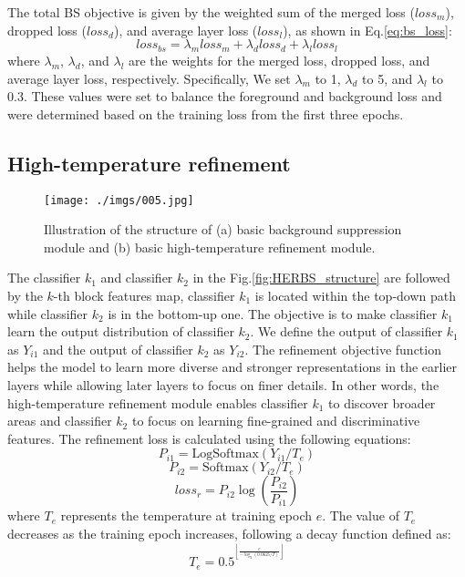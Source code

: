 \documentclass[journal]{IEEEtran}
\begin{document}
The total BS objective is given by the weighted sum of the merged loss ($loss_{m}$), dropped loss ($loss_{d}$), and average layer loss ($loss_{l}$), as shown in Eq.\eqref{eq:bs_loss}:
\begin{equation} \label{eq:bs_loss}
loss_{bs} = \lambda_{m}loss_{m} + \lambda_{d}loss_{d} + \lambda_{l}loss_{l}
\end{equation}
where $\lambda_{m}$, $\lambda_{d}$, and $\lambda_{l}$ are the weights for the merged loss, dropped loss, and average layer loss, respectively. Specifically, We set $\lambda_{m}$ to 1, $\lambda_{d}$ to 5, and $\lambda_{l}$ to 0.3. These values were set to balance the foreground and background loss and were determined based on the training loss from the first three epochs.

\subsection{High-temperature refinement}

\begin{figure}[t]
    \begin{center}
    \texttt{[image: ./imgs/005.jpg]}
    \end{center} 
\caption{Illustration of the structure of (a) basic background suppression module and (b) basic high-temperature refinement module.}
\label{fig:basic_module}
\end{figure}


The classifier $k_{1}$ and classifier $k_{2}$ in the Fig.\ref{fig:HERBS_structure} are followed by the $k$-th block features map, classifier $k_{1}$ is located within the top-down path while classifier $k_{2}$ is in the bottom-up one. The objective is to make classifier $k_{1}$ learn the output distribution of classifier $k_{2}$. We define the output of classifier $k_{1}$ as $Y_{i1}$ and the output of classifier $k_{2}$ as $Y_{i2}$. The refinement objective function helps the model to learn more diverse and stronger representations in the earlier layers while allowing later layers to focus on finer details. In other words, the high-temperature refinement module enables classifier $k_{1}$ to discover broader areas and classifier $k_{2}$ to focus on learning fine-grained and discriminative features. The refinement loss is calculated using the following equations:
\begin{equation} \label{eq:P_i1}
P_{i1} =  \text{LogSoftmax}(Y_{i1} / T_{e})
\end{equation}
\begin{equation} \label{eq:P_i2}
P_{i2} =  \text{Softmax}(Y_{i2} / T_{e})
\end{equation}
\begin{equation} \label{eq:kl_loss}
loss_{r} =  P_{i2}\log(\frac{P_{i2}}{P_{i1}})
\end{equation}
where $T_{e}$ represents the temperature at training epoch $e$. The value of $T_{e}$ decreases as the training epoch increases, following a decay function defined as:
\begin{equation} \label{eq:decrease_func}
T_{e} = 0.5^{^{\left\lfloor\frac{e}{-\log_{2}(0.0625/T)}\right\rfloor}}
\end{equation}
\end{document}
